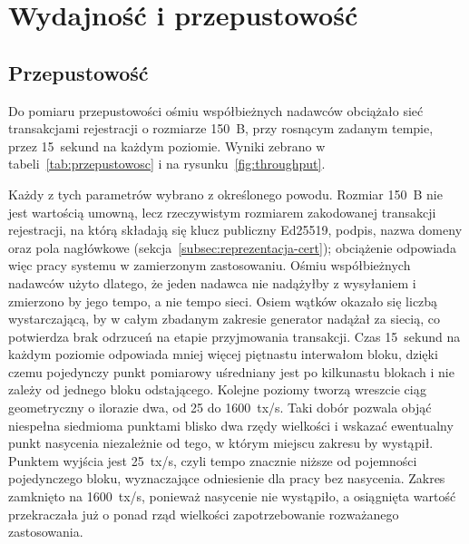 \section{Wydajność i przepustowość}
\label{sec:wydajnosc}

\subsection{Przepustowość}
\label{subsec:przepustowosc}

Do pomiaru przepustowości ośmiu współbieżnych nadawców obciążało sieć transakcjami rejestracji o rozmiarze 150~B, przy rosnącym zadanym tempie, przez 15~sekund na każdym poziomie. Wyniki zebrano w tabeli~\ref{tab:przepustowosc} i na rysunku~\ref{fig:throughput}.

Każdy z tych parametrów wybrano z określonego powodu. Rozmiar 150~B nie jest wartością umowną, lecz rzeczywistym rozmiarem zakodowanej transakcji rejestracji, na którą składają się klucz publiczny Ed25519, podpis, nazwa domeny oraz pola nagłówkowe (sekcja~\ref{subsec:reprezentacja-cert}); obciążenie odpowiada więc pracy systemu w zamierzonym zastosowaniu. Ośmiu współbieżnych nadawców użyto dlatego, że jeden nadawca nie nadążyłby z wysyłaniem i zmierzono by jego tempo, a nie tempo sieci. Osiem wątków okazało się liczbą wystarczającą, by w całym zbadanym zakresie generator nadążał za siecią, co potwierdza brak odrzuceń na etapie przyjmowania transakcji. Czas 15~sekund na każdym poziomie odpowiada mniej więcej piętnastu interwałom bloku, dzięki czemu pojedynczy punkt pomiarowy uśredniany jest po kilkunastu blokach i nie zależy od jednego bloku odstającego. Kolejne poziomy tworzą wreszcie ciąg geometryczny o ilorazie dwa, od 25 do \num{1600}~tx/s. Taki dobór pozwala objąć niespełna siedmioma punktami blisko dwa rzędy wielkości i wskazać ewentualny punkt nasycenia niezależnie od tego, w którym miejscu zakresu by wystąpił. Punktem wyjścia jest 25~tx/s, czyli tempo znacznie niższe od pojemności pojedynczego bloku, wyznaczające odniesienie dla pracy bez nasycenia. Zakres zamknięto na \num{1600}~tx/s, ponieważ nasycenie nie wystąpiło, a osiągnięta wartość przekraczała już o ponad rząd wielkości zapotrzebowanie rozważanego zastosowania.

